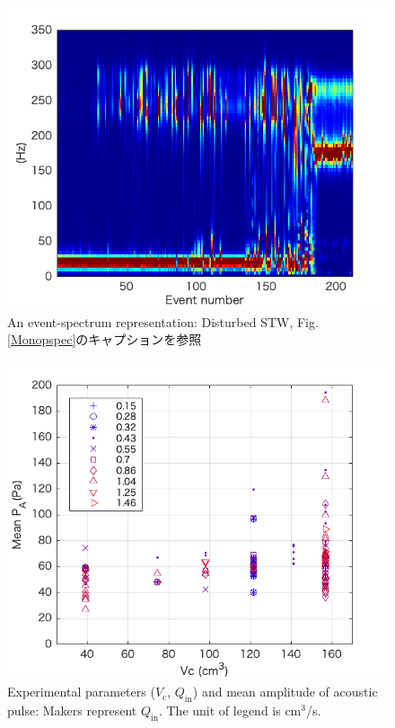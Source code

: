 \documentclass[12pt]{article}
\begin{document}
\begin{figure}[H]
\begin{center}
\includegraphics[scale=1] {Distpspec.png} 
\caption{An event-spectrum representation: Disturbed STW, Fig. \ref{Monopspec}のキャプションを参照}
\label{Distpspec}
\end{center}
\end{figure} 

\begin{figure}[H]
\begin{center}
\includegraphics[scale=1] {QVA.png} 
\caption{Experimental parameters ($V_\mathrm{c}$, $Q_\mathrm{in}$) and mean amplitude of acoustic pulse: Makers represent $Q_\mathrm{in}$. The unit of legend is cm$^3$/s.}
\label{QVA}
\end{center}
\end{figure} 
\end{document}
